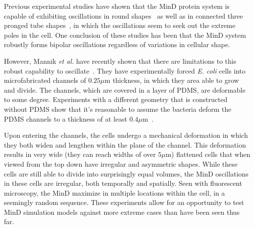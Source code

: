 \documentclass[10pt,letterpaper]{article}
\newcommand\micron{\ensuremath{\mu\text{m}}}
\begin{document}
Previous experimental studies have shown that the MinD protein system
is capable of exhibiting oscillations in round
shapes~\cite{fange2006noise} as well as in connected three pronged
tube shapes~\cite{varma2008min}, in which the oscillations seem to
seek out the extreme poles in the cell.  One conclusion of these
studies has been that the MinD system robustly forms bipolar
oscillations regardless of variations in cellular shape.

However, Mannik \emph{et al.} have recently shown that there are
limitations to this robust capability to
oscillate~\cite{mannik2012robustness,mannik2009bacterial,mannik2010bacteria}. They
have experimentally forced \emph{E. coli} cells into microfabricated
channels of $0.25\micron$ thickness, in which they area able to grow
and divide. The channels, which are covered in a layer of PDMS, are
deformable to some degree.  Experiments with a different geometry that
is constructed without PDMS show that it's reasonable to assume the
bacteria deform the PDMS channels to a thickness of at least
$0.4\micron$~\cite{mannik2009bacterial,mannik2010bacteria}.

Upon entering the channels, the cells undergo a mechanical deformation
in which they both widen and lengthen within the plane of the channel.
This deformation results in very wide (they can reach widths of over
$5\micron$) flattened cells that when viewed from the top down have
irregular and asymmetric shapes.  While these cells are still able to
divide into surprisingly equal volumes, the MinD oscillations in these
cells are irregular, both temporally and spatially. Seen with
fluorescent microscopy, the MinD maximize in multiple locations within
the cell, in a seemingly random sequence. These experiments allow for
an opportunity to test MinD simulation models against more extreme
cases than have been seen thus far.
\end{document}
